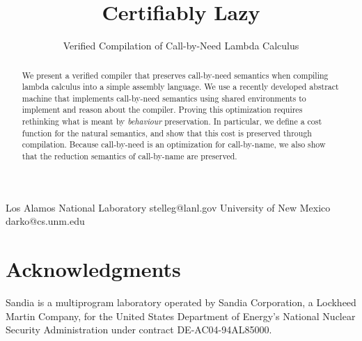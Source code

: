 \documentclass[preprint]{sigplanconf}
\begin{document}
\copyrightdata{[to be supplied]} 


\title{Certifiably Lazy}
\subtitle{Verified Compilation of Call-by-Need Lambda Calculus}

           {Los Alamos National Laboratory}
           {stelleg@lanl.gov}
           {University of New Mexico}
           {darko@cs.unm.edu}

\maketitle

\begin{abstract}
We present a verified compiler that preserves call-by-need semantics when
compiling lambda calculus into a simple assembly language. We use a recently
developed abstract machine that implements call-by-need semantics using shared
environments to implement and reason about the compiler. Proving this
optimization requires rethinking what is meant by \emph{behaviour}
preservation. In particular, we define a cost function for the natural
semantics, and show that this cost is preserved through compilation. Because
call-by-need is an optimization for call-by-name, we also show that the
reduction semantics of call-by-name are preserved.
\end{abstract}










\section{Acknowledgments}
Sandia is a multiprogram laboratory operated by Sandia Corporation, a Lockheed Martin Company, for the United States Department of Energy’s National Nuclear Security Administration under contract DE-AC04-94AL85000.



\end{document}
